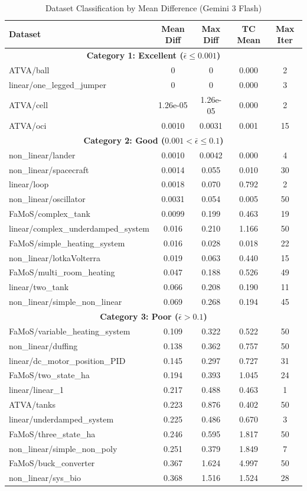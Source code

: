 \begin{table}[htbp]
\centering
\caption{Dataset Classification by Mean Difference (Gemini 3 Flash)}
\label{tab:dataset_classification}
\begin{tabular}{l|c|c|c|c}
\hline
\textbf{Dataset} & \textbf{Mean Diff} & \textbf{Max Diff} & \textbf{TC Mean} & \textbf{Max Iter} \\
\hline
\multicolumn{5}{c}{\textbf{Category 1: Excellent ($\bar{\epsilon} \leq 0.001$)}} \\
\hline
ATVA/ball & 0 & 0 & 0.000 & 2 \\
linear/one\_legged\_jumper & 0 & 0 & 0.000 & 3 \\
ATVA/cell & 1.26e-05 & 1.26e-05 & 0.000 & 2 \\
ATVA/oci & 0.0010 & 0.0031 & 0.001 & 15 \\
\hline
\multicolumn{5}{c}{\textbf{Category 2: Good ($0.001 < \bar{\epsilon} \leq 0.1$)}} \\
\hline
non\_linear/lander & 0.0010 & 0.0042 & 0.000 & 4 \\
non\_linear/spacecraft & 0.0014 & 0.055 & 0.010 & 30 \\
linear/loop & 0.0018 & 0.070 & 0.792 & 2 \\
non\_linear/oscillator & 0.0031 & 0.054 & 0.005 & 50 \\
FaMoS/complex\_tank & 0.0099 & 0.199 & 0.463 & 19 \\
linear/complex\_underdamped\_system & 0.016 & 0.210 & 1.166 & 50 \\
FaMoS/simple\_heating\_system & 0.016 & 0.028 & 0.018 & 22 \\
non\_linear/lotkaVolterra & 0.019 & 0.063 & 0.440 & 15 \\
FaMoS/multi\_room\_heating & 0.047 & 0.188 & 0.526 & 49 \\
linear/two\_tank & 0.066 & 0.208 & 0.190 & 11 \\
non\_linear/simple\_non\_linear & 0.069 & 0.268 & 0.194 & 45 \\
\hline
\multicolumn{5}{c}{\textbf{Category 3: Poor ($\bar{\epsilon} > 0.1$)}} \\
\hline
FaMoS/variable\_heating\_system & 0.109 & 0.322 & 0.522 & 50 \\
non\_linear/duffing & 0.138 & 0.362 & 0.757 & 50 \\
linear/dc\_motor\_position\_PID & 0.145 & 0.297 & 0.727 & 31 \\
FaMoS/two\_state\_ha & 0.194 & 0.393 & 1.045 & 24 \\
linear/linear\_1 & 0.217 & 0.488 & 0.463 & 1 \\
ATVA/tanks & 0.223 & 0.876 & 0.402 & 50 \\
linear/underdamped\_system & 0.225 & 0.486 & 0.670 & 3 \\
FaMoS/three\_state\_ha & 0.246 & 0.595 & 1.817 & 50 \\
non\_linear/simple\_non\_poly & 0.251 & 0.379 & 1.849 & 7 \\
FaMoS/buck\_converter & 0.367 & 1.624 & 4.997 & 50 \\
non\_linear/sys\_bio & 0.368 & 1.516 & 1.524 & 28 \\
\hline
\end{tabular}
\end{table}